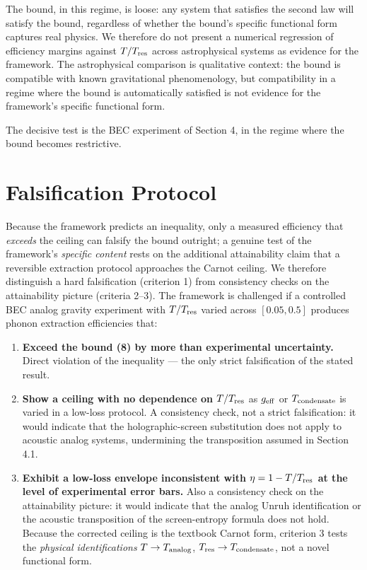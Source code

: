 \documentclass[11pt]{article}
\providecommand{\tightlist}{\setlength{\itemsep}{2pt}\setlength{\parskip}{0pt}}
\begin{document}
The bound, in this regime, is loose: any system that satisfies the second law will satisfy the bound, regardless of whether the bound's specific functional form captures real physics. We therefore do not present a numerical regression of efficiency margins against \(T/T_{\rm res}\) across astrophysical systems as evidence for the framework. The astrophysical comparison is qualitative context: the bound is compatible with known gravitational phenomenology, but compatibility in a regime where the bound is automatically satisfied is not evidence for the framework's specific functional form.

The decisive test is the BEC experiment of Section 4, in the regime where the bound becomes restrictive.

\section{Falsification Protocol}\label{falsification-protocol}

Because the framework predicts an inequality, only a measured efficiency that \emph{exceeds} the ceiling can falsify the bound outright; a genuine test of the framework's \emph{specific content} rests on the additional attainability claim that a reversible extraction protocol approaches the Carnot ceiling. We therefore distinguish a hard falsification (criterion 1) from consistency checks on the attainability picture (criteria 2--3). The framework is challenged if a controlled BEC analog gravity experiment with \(T/T_{\rm res}\) varied across \([0.05, 0.5]\) produces phonon extraction efficiencies that:

\begin{enumerate}
\def\labelenumi{\arabic{enumi}.}
\tightlist
\item
  \textbf{Exceed the bound (8) by more than experimental uncertainty.} Direct violation of the inequality --- the only strict falsification of the stated result.
\item
  \textbf{Show a ceiling with no dependence on \(T/T_{\rm res}\)} as \(g_{\rm eff}\) or \(T_{\rm condensate}\) is varied in a low-loss protocol. A consistency check, not a strict falsification: it would indicate that the holographic-screen substitution does not apply to acoustic analog systems, undermining the transposition assumed in Section 4.1.
\item
  \textbf{Exhibit a low-loss envelope inconsistent with \(\eta = 1 - T/T_{\rm res}\) at the level of experimental error bars.} Also a consistency check on the attainability picture: it would indicate that the analog Unruh identification or the acoustic transposition of the screen-entropy formula does not hold. Because the corrected ceiling is the textbook Carnot form, criterion 3 tests the \emph{physical identifications} \(T \to T_{\rm analog}\), \(T_{\rm res} \to T_{\rm condensate}\), not a novel functional form.
\end{enumerate}
\end{document}
